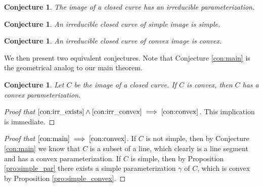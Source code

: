 \documentclass{amsart}
\newtheorem{conjecture}[proposition]{Conjecture}
\theoremstyle{definition}
\theoremstyle{remark}
\begin{document}
\begin{conjecture}
    \label{con:irr_exists}
    The image of a closed curve has an irreducible parameterization.
\end{conjecture}

\begin{conjecture}
    \label{con:irr_simple}
    An irreducible closed curve of simple image is simple.
\end{conjecture}

\begin{conjecture}
    \label{con:irr_convex}
    An irreducible closed curve of convex image is convex.
\end{conjecture}


We then present two equivalent conjectures.
Note that Conjecture \ref{con:main} is the geometrical analog to
our main theorem.

\begin{conjecture}
    \label{con:convex}
    Let $C$ be the image of a closed curve. If $C$ is convex,
    then $C$ has a convex parameterization.
\end{conjecture}

\begin{proof}[Proof that
    $\ref{con:irr_exists}\land\ref{con:irr_convex}
        \implies\ref{con:convex}$]
    This implication is immediate.
\end{proof}

\begin{proof}[Proof that $\ref{con:main}\implies\ref{con:convex}$]
    If $C$ is not simple, then by Conjecture
    \ref{con:main} we know that $C$ is a subset of a line,
    which clearly is a line segment and has a convex parameterization.
    If $C$ is simple, then by Proposition \ref{pro:simple_par}
    there exists a simple parameterization $\gamma$ of $C$,
    which is convex by Proposition \ref{pro:simple_convex}.
\end{proof}
\end{document}
